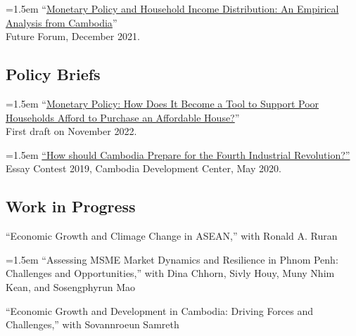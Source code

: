 \documentclass[10pt,a4paper]{article}
\begin{document}
	\hangindent=1.5em
	“\href{https://kosalnith.github.io/research/papers/MPHI.pdf}{Monetary Policy and Household Income Distribution: An Empirical Analysis from Cambodia}” \\
	Future Forum, December 2021. 

\subsection*{Policy Briefs}
	
		\hangindent=1.5em
		“\href{}{Monetary Policy: How Does It Become a Tool to Support Poor Households Afford to Purchase an Affordable House?}” \\
		First draft on November 2022. \\ \vspace{-.5em}
	
		\hangindent=1.5em
		\href{https://cd-center.org/en/essay-contest-2019-first-place-winner/}{``How should Cambodia Prepare for the Fourth Industrial Revolution?''} \\
		Essay Contest 2019, Cambodia Development Center, May 2020.

\subsection*{Work in Progress}
	
	``Economic Growth and Climage Change in ASEAN,'' with Ronald A. Ruran\\ \vspace{-.5em}
	
	\hangindent=1.5em
	``Assessing MSME Market Dynamics and Resilience in Phnom Penh: Challenges and Opportunities,'' with Dina Chhorn, Sivly Houy, Muny Nhim Kean, and Sosengphyrun Mao\\ \vspace{-.5em}
	
	``Economic Growth and Development in Cambodia: Driving Forces and Challenges,'' with Sovannroeun Samreth\\ \vspace{-.5em}
\end{document}
